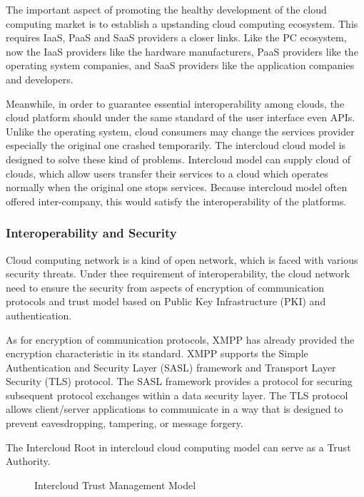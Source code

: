 \documentclass[conference]{IEEEtran}
\begin{document}
The important aspect of promoting the healthy development of the cloud computing market is to establish a upstanding cloud computing ecosystem. This requires IaaS, PaaS and SaaS providers a closer links. Like the PC ecosystem, now the IaaS providers like the hardware manufacturers, PaaS providers like the operating system companies, and SaaS providers like the application companies and developers. 

Meanwhile, in order to guarantee essential interoperability among clouds, the cloud platform should under the same standard of the user interface even APIs. Unlike the operating system, cloud consumers may change the services provider especially the original one crashed temporarily. The intercloud cloud model is designed to solve these kind of problems. Intercloud model can supply cloud of clouds, which allow users transfer their services to a cloud which operates normally when the original one stops services. Because intercloud model often offered inter-company, this would satisfy the interoperability of the platforms.


\subsubsection{Interoperability and Security}
Cloud computing network is a kind of open network, which is faced with various security threats. Under thee requirement of interoperability, the cloud network need to ensure the security from aspects of encryption of communication protocols and trust model based on Public Key Infrastructure (PKI) and authentication.

As for encryption of communication protocols, XMPP has already provided the encryption characteristic in its standard.\cite{RFC6120} XMPP supports the Simple Authentication and Security Layer (SASL) framework and Transport Layer Security (TLS) protocol. The SASL framework provides a protocol for securing subsequent protocol exchanges within a data security layer.\cite{RFC4422} The TLS protocol allows client/server applications to communicate in a way that is designed to prevent eavesdropping, tampering, or message forgery.\cite{RFC5246}

The Intercloud Root in intercloud cloud computing model can serve as a Trust Authority. \cite{intercloud_economy}

\begin{figure}[h]
\centering
{}
\caption{Intercloud Trust Management Model}
\label{fig_06}
\end{figure}
\end{document}
